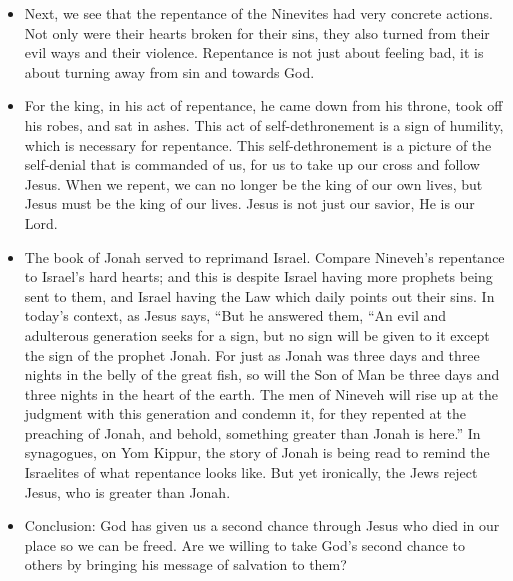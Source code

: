 \begin{itemize}
  \item{Next, we see that the repentance of the Ninevites had very concrete actions. Not only were their hearts broken for their sins, they also turned from their evil ways and their violence. Repentance is not just about feeling bad, it is about turning away from sin and towards God. }
  \item{For the king, in his act of repentance, he came down from his throne, took off his robes, and sat in ashes. This act of self-dethronement is a sign of humility, which is necessary for repentance. This self-dethronement is a picture of the self-denial that is commanded of us, for us to take up our cross and follow Jesus. When we repent, we can no longer be the king of our own lives, but Jesus must be the king of our lives. Jesus is not just our savior, He is our Lord.}
  \item{The book of Jonah served to reprimand Israel. Compare Nineveh’s repentance to Israel’s hard hearts; and this is despite Israel having more prophets being sent to them, and Israel having the Law which daily points out their sins. In today’s context, as Jesus says, “But he answered them, “An evil and adulterous generation seeks for a sign, but no sign will be given to it except the sign of the prophet Jonah. For just as Jonah was three days and three nights in the belly of the great fish, so will the Son of Man be three days and three nights in the heart of the earth. The men of Nineveh will rise up at the judgment with this generation and condemn it, for they repented at the preaching of Jonah, and behold, something greater than Jonah is here.” In synagogues, on Yom Kippur, the story of Jonah is being read to remind the Israelites of what repentance looks like. But yet ironically, the Jews reject Jesus, who is greater than Jonah.}
  \item{Conclusion: God has given us a second chance through Jesus who died in our place so we can be freed. Are we willing to take God’s second chance to others by bringing his message of salvation to them?}
\end{itemize}